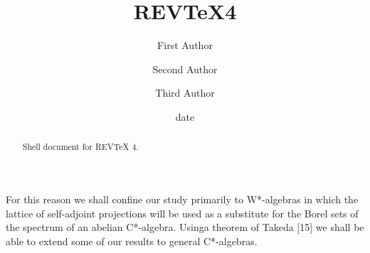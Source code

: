 \documentclass[aps,preprint]{revtex4}%
\begin{document}
\title[Short title for running header]{REV\TeX4}
\author{First Author}
\author{Second Author}
\author{Third Author}

\begin{abstract}
Shell document for REV\TeX{} 4.

\end{abstract}
\date[Date text]{date}




\maketitle
\tableofcontents


For this reason we shall confine our study primarily to W*-algebras in which
the lattice of self-adjoint projections will be used as a substitute for the
Borel sets of the spectrum of an abelian C*-algebra. Usinga theorem of Takeda
[15] we shall be able to extend some of our results to general C*-algebras.
\end{document}
